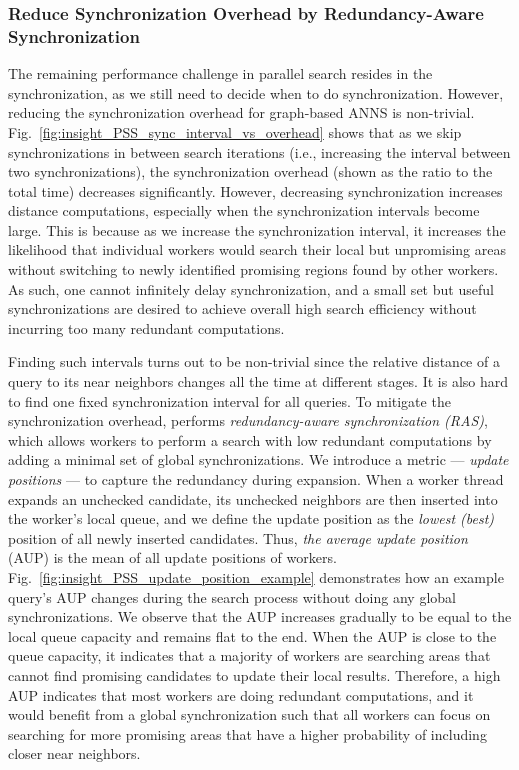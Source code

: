 \subsubsection{Reduce Synchronization Overhead by Redundancy-Aware Synchronization}

The remaining performance challenge in parallel search resides in the synchronization, as we still need to decide when to do synchronization. However, reducing the synchronization overhead for graph-based ANNS is non-trivial.
Fig.~\ref{fig:insight_PSS_sync_interval_vs_overhead} shows that as we skip synchronizations in between search iterations (i.e., increasing the interval between two synchronizations), the synchronization overhead (shown as the ratio to the total time) decreases significantly. However, decreasing synchronization increases distance computations, especially when the synchronization intervals become large. This is because as we increase the synchronization interval, it increases the likelihood that individual workers would search their local but unpromising areas without switching to newly identified promising regions found by other workers. As such, one cannot infinitely delay synchronization, and a small set but useful synchronizations are desired to achieve overall high search efficiency without incurring too many redundant computations.  

Finding such intervals turns out to be non-trivial since the relative distance of a query to its near neighbors changes all the time at different stages. It is also hard to find one fixed synchronization interval for all queries. 
To mitigate the synchronization overhead, \Hammer performs \emph{redundancy-aware synchronization (RAS)}, which allows workers to perform a search with low redundant computations by adding a minimal set of global synchronizations. 
We introduce a metric --- \emph{update positions} --- to capture the redundancy during expansion.
When a worker thread expands an unchecked candidate, its unchecked neighbors are then inserted into the worker's local queue, and we define the update position as the \emph{lowest (best)} position of all newly inserted candidates. Thus, \emph{the average update position} (AUP) is the mean of all update positions of workers. 
Fig.~\ref{fig:insight_PSS_update_position_example} demonstrates how an example query's AUP changes during the search process without doing any global synchronizations. We observe that the AUP increases gradually to be equal to the local queue capacity and remains flat to the end. 
When the AUP is close to the queue capacity, it indicates that a majority of workers are searching areas that cannot find promising candidates to update their local results. Therefore, a high AUP indicates that most workers are doing redundant computations, and it would benefit from a global synchronization such that all workers can focus on searching for more promising areas that have a higher probability of including closer near neighbors. 

